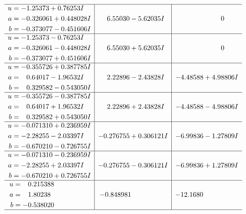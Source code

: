 \documentclass[1p]{elsarticle_modified}
\theoremstyle{definition}
\begin{document}
$$\begin{array}{c|c|c}
 \hline 
\begin{aligned}
u &= -1.25373 + 0.76253 I \\
a &= -0.326061 + 0.448028 I \\
b &= -0.373077 - 0.451606 I\end{aligned}
 & \phantom{-}6.55030 - 5.62035 I & \phantom{-0.000000 } 0 \\ \hline\begin{aligned}
u &= -1.25373 - 0.76253 I \\
a &= -0.326061 - 0.448028 I \\
b &= -0.373077 + 0.451606 I\end{aligned}
 & \phantom{-}6.55030 + 5.62035 I & \phantom{-0.000000 } 0 \\ \hline\begin{aligned}
u &= -0.355726 + 0.387785 I \\
a &= \phantom{-}0.64017 - 1.96532 I \\
b &= \phantom{-}0.329582 - 0.543050 I\end{aligned}
 & \phantom{-}2.22896 - 2.43828 I & -4.48588 + 4.98806 I \\ \hline\begin{aligned}
u &= -0.355726 - 0.387785 I \\
a &= \phantom{-}0.64017 + 1.96532 I \\
b &= \phantom{-}0.329582 + 0.543050 I\end{aligned}
 & \phantom{-}2.22896 + 2.43828 I & -4.48588 - 4.98806 I \\ \hline\begin{aligned}
u &= -0.071310 + 0.236959 I \\
a &= -2.28255 - 2.03397 I \\
b &= -0.670210 - 0.726755 I\end{aligned}
 & -0.276755 + 0.306121 I & -6.99836 - 1.27809 I \\ \hline\begin{aligned}
u &= -0.071310 - 0.236959 I \\
a &= -2.28255 + 2.03397 I \\
b &= -0.670210 + 0.726755 I\end{aligned}
 & -0.276755 - 0.306121 I & -6.99836 + 1.27809 I \\ \hline\begin{aligned}
u &= \phantom{-}0.215388\phantom{ +0.000000I} \\
a &= \phantom{-}1.80238\phantom{ +0.000000I} \\
b &= -0.538020\phantom{ +0.000000I}\end{aligned}
 & -0.848981\phantom{ +0.000000I} & -12.1680\phantom{ +0.000000I}\\
 \hline 
 \end{array}$$\newpage\newpage\renewcommand{\arraystretch}{1}
\end{document}
